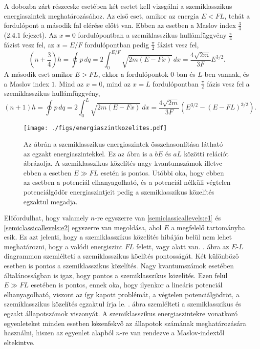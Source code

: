 A dobozba zárt részecske esetében két esetet kell vizsgálni a szemiklasszikus energiaszintek meghatározásához. Az első eset, amikor az energia $E < FL$, tehát a fordulópont a második fal elérése előtt van. Ebben az esetben a Maslov index $\frac{3}{4}$ \cite{brack:semiclassical} (2.4.1 fejezet). Az $x=0$ fordulópontban a szemiklasszikus hullámfüggvény $\frac{\pi}{4}$ fázist vesz fel, az $x=E/F$ fordulópontban pedig $\frac{\pi}{2}$ fázist vesz fel,
\begin{equation}
	\left(n+\frac{3}{4}\right)h=\oint p\,dq=2\int_0^{E/F}\sqrt{2m\left( E-Fx \right)}\,dx=\frac{4\sqrt{2m}}{3F}E^{3/2}.
	\label{semiclassicallevels:e1}
\end{equation}
A második eset amikor $E > FL$, ekkor a fordulópontok $0$-ban és $L$-ben vannak, és a Maslov index $1$. Mind az $x=0$, mind az $x=L$ fordulópontban $\frac{\pi}{2}$ fázis vesz fel a szemiklasszikus hullámfüggvény,
\begin{equation}
	\left(n+1\right)h=\oint p\,dq=2\int_0^{L}\sqrt{2m\left(E-Fx\right)}\,dx=\frac{4\sqrt{2m}}{3F}\left(E^{3/2}-\left(E-FL\right)^{3/2}\right).
	\label{semiclassicallevels:e2}
\end{equation}
\begin{figure}[H]
	\centering
	\texttt{[image: ./figs/energiaszintkozelites.pdf]}
	\caption[Szemiklasszikus energiaszintek]{Az ábrán a szemiklasszikus energiaszintek összehasonlítása látható az egzakt energiaszintekkel. Ez az ábra is a $bE$ és $aL$ közötti relációt ábrázolja. A szemiklasszikus közelítés nagy kvantumszámok illetve ebben a esetben $E \gg FL$ esetén is pontos. Utóbbi oka, hogy ebben az esetben a potenciál elhanyagolható, és a potenciál nélküli végtelen potenciálgödör energiaszintjeit pedig a szemiklasszikus közelítés egzaktul megadja.}
	\label{semiclassicallevels:kozelites}
\end{figure}
Előfordulhat, hogy valamely $n$-re egyszerre van \eqref{semiclassicallevels:e1} és \eqref{semiclassicallevels:e2} egyszerre van megoldása, ahol $E$ a megfelelő tartományba esik. Ez azt jelenti, hogy a szemiklasszikus közelítés hibáján belül nem lehet meghatározni, hogy a valódi energiszint $FL$ felett, vagy alatt van. . ábra az $E$-$L$ diagrammon szemlélteti a szemiklasszikus köelítés pontosságát. Két különböző esetben is pontos a szemiklasszikus közelítés. Nagy kvantumszámok esetében általánosságban is igaz, hogy pontos a szemiklasszikus közelítés. Ezen felül $E\gg FL$ esetében is pontos, ennek oka, hogy ilyenkor a lineáris potenciál elhanyagolható, viszont az így kapott problémát, a végtelen potenciálgödröt, a szemiklasszikus közelítés egzaktul írja le. . ábra szemlélteti a szemiklasszikus és egzakt állapotszámok viszonyát. A szemiklasszikus energiaszintekre vonatkozó egyenleteket minden esetben kézenfekvő az állapotok számának meghatározására használni, hiszen az egyenlet alapból $n$-re van rendezve a Maslov-indextől eltekintve. 
